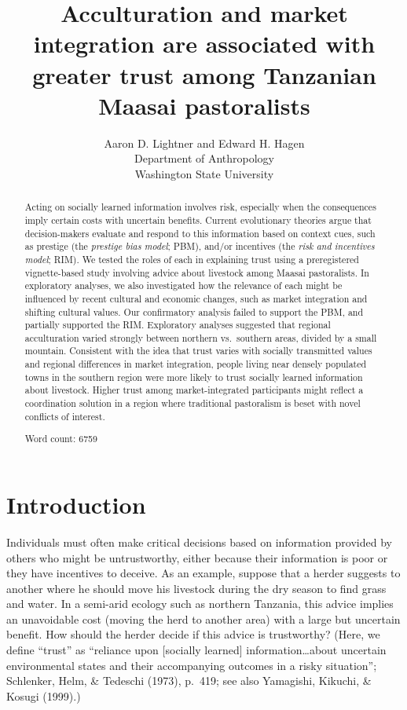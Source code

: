 \documentclass[
  11pt,
]{article}
\title{\LARGE \textbf{Acculturation and market integration are associated with greater trust among Tanzanian Maasai pastoralists}}
\author{Aaron D. Lightner and Edward H. Hagen \\ Department of Anthropology \\ Washington State University}
\date{}
\begin{document}
\maketitle
\begin{abstract}
Acting on socially learned information involves risk, especially when
the consequences imply certain costs with uncertain benefits. Current
evolutionary theories argue that decision-makers evaluate and respond to
this information based on context cues, such as prestige (the
\emph{prestige bias model}; PBM), and/or incentives (the \emph{risk and
incentives model}; RIM). We tested the roles of each in explaining trust
using a preregistered vignette-based study involving advice about
livestock among Maasai pastoralists. In exploratory analyses, we also
investigated how the relevance of each might be influenced by recent
cultural and economic changes, such as market integration and shifting
cultural values. Our confirmatory analysis failed to support the PBM,
and partially supported the RIM. Exploratory analyses suggested that
regional acculturation varied strongly between northern vs.~southern
areas, divided by a small mountain. Consistent with the idea that trust
varies with socially transmitted values and regional differences in
market integration, people living near densely populated towns in the
southern region were more likely to trust socially learned information
about livestock. Higher trust among market-integrated participants might
reflect a coordination solution in a region where traditional
pastoralism is beset with novel conflicts of interest.

Word count: 6759
\end{abstract}


\newpage


\hypertarget{introduction}{%
\section{Introduction}\label{introduction}}

Individuals must often make critical decisions based on information
provided by others who might be untrustworthy, either because their
information is poor or they have incentives to deceive. As an example,
suppose that a herder suggests to another where he should move his
livestock during the dry season to find grass and water. In a semi-arid
ecology such as northern Tanzania, this advice implies an unavoidable
cost (moving the herd to another area) with a large but uncertain
benefit. How should the herder decide if this advice is trustworthy?
(Here, we define ``trust'' as ``reliance upon {[}socially learned{]}
information\ldots about uncertain environmental states and their
accompanying outcomes in a risky situation''; Schlenker, Helm, \&
Tedeschi (1973), p.~419; see also Yamagishi, Kikuchi, \& Kosugi (1999).)
\end{document}
